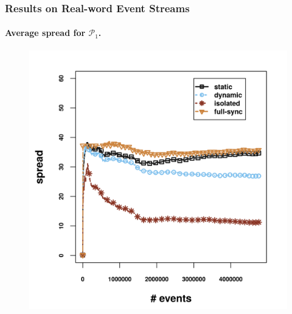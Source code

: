 \begin{frame}
	
	\frametitle{Results on Real-word Event Streams }
	\framesubtitle{Average spread for $\mathcal{P}_1$.}
	
	\begin{center}
		
		\begin{figure}[]
			\centering
			\includegraphics[width=.9\textwidth,height=.8\textheight]{../chapters/figures/synopses/new/spread_p1.png}
			
		\end{figure}
	\end{center}
	
\end{frame}


